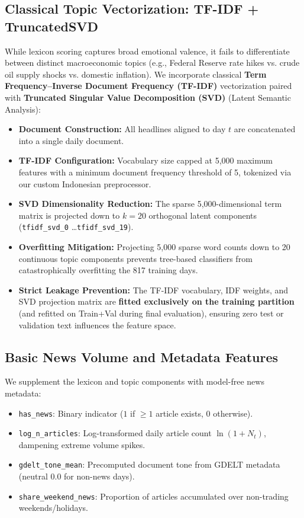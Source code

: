 \documentclass[10pt,a4paper]{article}
\begin{document}
\subsection{Classical Topic Vectorization: TF-IDF + TruncatedSVD}
While lexicon scoring captures broad emotional valence, it fails to differentiate between distinct macroeconomic topics (e.g., Federal Reserve rate hikes vs. crude oil supply shocks vs. domestic inflation). We incorporate classical \textbf{Term Frequency--Inverse Document Frequency (TF-IDF)} vectorization paired with \textbf{Truncated Singular Value Decomposition (SVD)} (Latent Semantic Analysis):
\begin{itemize}[leftmargin=1.5em]
    \item \textbf{Document Construction:} All headlines aligned to day $t$ are concatenated into a single daily document.
    \item \textbf{TF-IDF Configuration:} Vocabulary size capped at 5,000 maximum features with a minimum document frequency threshold of 5, tokenized via our custom Indonesian preprocessor.
    \item \textbf{SVD Dimensionality Reduction:} The sparse 5,000-dimensional term matrix is projected down to $k=20$ orthogonal latent components (\texttt{tfidf\_svd\_0} \dots \texttt{tfidf\_svd\_19}).
    \item \textbf{Overfitting Mitigation:} Projecting 5,000 sparse word counts down to 20 continuous topic components prevents tree-based classifiers from catastrophically overfitting the 817 training days.
    \item \textbf{Strict Leakage Prevention:} The TF-IDF vocabulary, IDF weights, and SVD projection matrix are \textbf{fitted exclusively on the training partition} (and refitted on Train+Val during final evaluation), ensuring zero test or validation text influences the feature space.
\end{itemize}

\subsection{Basic News Volume and Metadata Features}
We supplement the lexicon and topic components with model-free news metadata:
\begin{itemize}[leftmargin=1.5em]
    \item \texttt{has\_news}: Binary indicator ($1$ if $\ge 1$ article exists, $0$ otherwise).
    \item \texttt{log\_n\_articles}: Log-transformed daily article count $\ln(1 + N_t)$, dampening extreme volume spikes.
    \item \texttt{gdelt\_tone\_mean}: Precomputed document tone from GDELT metadata (neutral $0.0$ for non-news days).
    \item \texttt{share\_weekend\_news}: Proportion of articles accumulated over non-trading weekends/holidays.
\end{itemize}
\end{document}
